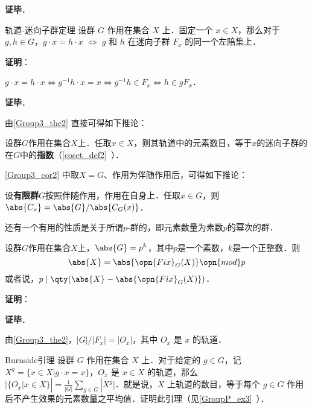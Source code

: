 \textbf{证毕}．




\begin{theorem}{轨道-迷向子群定理}\label{Group3_the2}
设群 $G$ 作用在集合 $X$ 上．固定一个 $x\in X$，那么对于 $g, h\in G$，$g\cdot x= h\cdot x$ $\iff$ $g$ 和 $h$ 在迷向子群 $F_x$ 的同一个左陪集上．
\end{theorem}

\textbf{证明}：

 $g\cdot x=h\cdot x\iff g^{-1}h\cdot x=x\iff g^{-1}h\in F_x\iff h\in gF_x$．

\textbf{证毕}．






由\autoref{Group3_the2} 直接可得如下推论：


\begin{corollary}{}\label{Group3_cor2}

设群$G$作用在集合$X$上．任取$x\in X$，则其轨道中的元素数目，等于$x$的迷向子群的在$G$中的\textbf{指数}（\autoref{coset_def2}~）．

\end{corollary}




\autoref{Group3_cor2} 中取$X=G$、作用为伴随作用后，可得如下推论：

\begin{corollary}{}\label{Group3_cor3}

设\textbf{有限群}$G$按照伴随作用，作用在自身上．任取$x\in G$，则$\abs{C_x}=\abs{G}/\abs{C_G(x)}$．

\end{corollary}




还有一个有用的性质是关于所谓$p$-群的，即元素数量为素数$p$的幂次的群．


\begin{theorem}{}
设群$G$作用在集合$X$上，$\abs{G}=p^k$，其中$p$是一个素数，$k$是一个正整数．则
\begin{equation}
\abs{X} = \abs{\opn{Fix}_G(X)} \opn{mod} p
\end{equation}
或者说，$p\mid \qty(\abs{X}-\abs{\opn{Fix}_G(X)})$．
\end{theorem}

\textbf{证明}：



\textbf{证毕}．








\begin{corollary}{}\label{Group3_cor1}
由\autoref{Group3_the2}，$|G|/|F_x|=|O_x|$，其中 $O_x$ 是 $x$ 的轨道．
\end{corollary}

\begin{exercise}{Burnside引理}\label{Group3_exe2}
设群 $G$ 作用在集合 $X$ 上．对于给定的 $g\in G$，记 $X^g=\{x\in X|g\cdot x=x\}$，$O_x$ 是 $x\in X$ 的轨道，那么 $|\{O_x|x\in X\}|=\frac{1}{|G|}\sum_{g\in G}|X^g|$．就是说，$X$ 上轨道的数目，等于每个 $g\in G$ 作用后不产生效果的元素数量之平均值．证明此引理（见\autoref{GroupP_ex3}~）．
\end{exercise}
